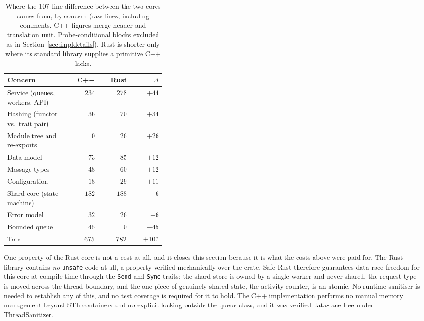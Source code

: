\documentclass[english,twoside,openright,a4paper,censored,csm,software-track-2020]{HYthesisML}
\begin{document}
\begin{table}[H]
\centering
\small
\caption[Where the line-count difference between the cores comes from]{Where the $\LocGap$-line difference between the two cores comes from, by concern (raw
lines, including comments. C++ figures merge header and translation unit. Probe-conditional
blocks excluded as in Section~\ref{sec:impldetails}). Rust is shorter
only where its standard library supplies a primitive C++ lacks.\label{tab:loc}}
\begin{tabular}{@{}R{0.38\linewidth} r r r@{}}
\hline\hline
Concern & C++ & Rust & $\Delta$ \\
\hline
Service (queues, workers, API)    & $234$ & $278$ & $+44$ \\
Hashing (functor vs.\ trait pair) & $36$  & $70$  & $+34$ \\
Module tree and re-exports        & $0$   & $26$  & $+26$ \\
Data model                        & $73$  & $85$  & $+12$ \\
Message types                     & $48$  & $60$  & $+12$ \\
Configuration                     & $18$  & $29$  & $+11$ \\
Shard core (state machine)        & $182$ & $188$ & $+6$ \\
Error model                       & $32$  & $26$  & $-6$ \\
Bounded queue                     & $45$  & $0$   & $-45$ \\
\hline
Total                             & $675$ & $782$ & $+107$ \\
\hline
\end{tabular}
\end{table}

One property of the Rust core is not a cost at all, and it closes this section because it is what
the costs above were paid for. The Rust library contains \emph{no} \texttt{unsafe} code at all, a property verified
mechanically over the crate. Safe Rust therefore guarantees data-race freedom for this core at
compile time through the \texttt{Send} and \texttt{Sync} traits: the shard store is owned by a
single worker and never shared, the request type is moved across the thread boundary, and the
one piece of genuinely shared state, the activity counter, is an atomic. No runtime sanitiser
is needed to establish any of this, and no test coverage is required for it to hold. The C++
implementation performs no manual memory management beyond STL containers and no explicit
locking outside the queue class, and it was verified data-race free under ThreadSanitizer.
\end{document}
